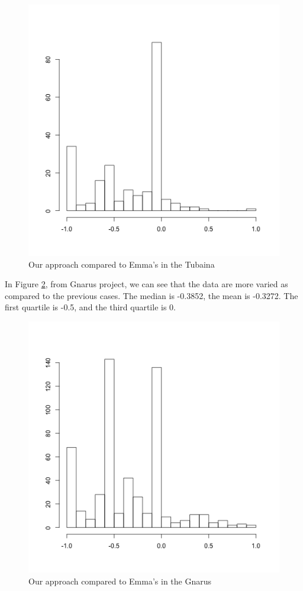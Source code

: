 \documentclass{sig-alternate}
\begin{document}
\begin{figure}[h!H]
  \centering
  \includegraphics[scale=0.4]{../stats/tubaina-histograma-gelato.png}
  \caption{Our approach compared to Emma's in the Tubaina}
  \label{fig:tubaina}
\end{figure}


In Figure \ref{fig:gnarus}, from Gnarus project, we can see that the data are more varied as 
compared to the previous cases. The median is -0.3852, the mean is -0.3272. The first quartile
is -0.5, and the third quartile is 0.

\begin{figure}[h!H]
  \centering
  \includegraphics[scale=0.4]{../stats/gnarus-histograma-gelato.png}
  \caption{Our approach compared to Emma's in the Gnarus}
  \label{fig:gnarus}
\end{figure}
\end{document}
